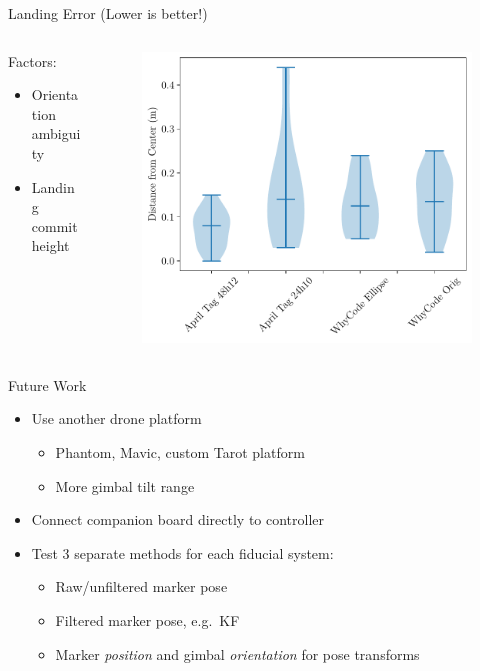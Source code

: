 \documentclass[aspectratio=169]{beamer}
\newif\ifpause
\newcommand{\mypause}{\ifpause \pause \fi}
\begin{document}
\begin{frame}{Landing Error (Lower is better!)}
\begin{columns}
\begin{column}{0.34\textwidth}
	Factors:
	\begin{itemize}
		\item Orientation ambiguity
		\item Landing commit height
	\end{itemize}
\end{column}
\begin{column}{0.65\textwidth}
	\begin{figure}
		\centering
		\includegraphics[width=\textwidth]{./images/violin_plot_landing_radii}
	\end{figure}
\end{column}
\end{columns}
\end{frame}

\begin{frame}{Future Work}
	\begin{itemize}
		\item Use another drone platform\mypause
		\begin{itemize}
			\item Phantom, Mavic, custom Tarot platform
			\item More gimbal tilt range\mypause
		\end{itemize}
		\item Connect companion board directly to controller
			\mypause
		\item Test 3 separate methods for each fiducial system:
		\begin{itemize}
			\item Raw/unfiltered marker pose
				\mypause
			\item Filtered marker pose, e.g.~KF
				\mypause
			\item Marker \emph{position} and gimbal \emph{orientation} for pose transforms
		\end{itemize}
	\end{itemize}
\end{frame}
\end{document}
